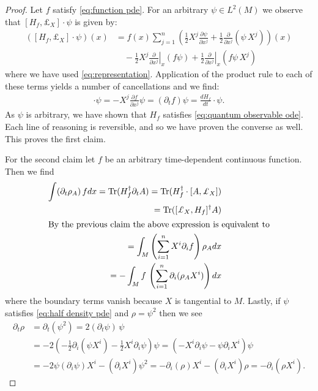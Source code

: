 \documentclass[final,leqno]{siamart}
\newcommand{\pder}[2]{\ensuremath{\frac{ \partial #1}{\partial #2}}}
\DeclareMathOperator{\Tr}{Tr}
\begin{document}
\begin{proof}
	Let $f$ satisfy \eqref{eq:function pde}.
	For an arbitrary $\psi \in L^{2}(M)$ we observe that $[ H_{f} , \pounds_{X}] \cdot \psi$ is given by:
	\begin{align*}
		\left( [ H_{f}, \pounds_{X} ] \cdot \psi \right)(x) &= f(x) \sum_{j=1}^{n} \left( \frac{1}{2} X^{j} \pder{\psi}{x^{j}} + \frac{1}{2} \pder{}{x^{j}} ( \psi \, X^{j} ) \right) (x) \\
			&\quad- \frac{1}{2} X^{j} \left. \pder{}{x^{j}} \right|_{x}( f \psi)  + \frac{1}{2} \left. \pder{}{x^{j}} \right|_{x}(f \psi \, X^{j} )
	\end{align*}
	where we have used \eqref{eq:representation}.  
	Application of the product rule to each of these terms yields a number of cancellations and we find:
	\begin{align*}
		[ H_{f} , \pounds_{X} ] \cdot \psi = - X^{j} \pder{f}{x^{j}} \psi = (\partial_{t} f )\psi = \frac{d H_{f} }{dt} \cdot \psi.
	\end{align*}
	As $\psi$ is arbitrary, we have shown that $H_{f}$ satisfies \eqref{eq:quantum observable ode}.
	Each line of reasoning is reversible, and so we have proven the converse as well.
	This proves the first claim.
	
	For the second claim let $f$ be an arbitrary time-dependent continuous function.
	Then we find
	\begin{align*}
		\int ( \partial_t \rho_A ) \, f dx = \Tr( H_f^\dagger \partial_t A ) = \Tr( H_f^\dagger \cdot [A , \pounds_X] ) \\
		= \Tr( [\pounds_X,H_f]^\dagger A) \\
		\intertext{By the previous claim the above expression is equivalent to}
		= \int_M \left( \sum_{i=1}^{n} X^i \partial_i f \right) \rho_A dx \\
		= - \int_M f \, \left(\sum_{i=1}^{n} \partial_i (\rho_A X^i ) \right) dx
	\end{align*}
	where the boundary terms vanish because $X$ is tangential to $M$.
%	
%	
	Lastly, if $\psi$ satisfies \eqref{eq:half density pde} and $\rho = \psi^{2}$ then we see
	\begin{align*}
		\partial_{t} \rho &= \partial_{t} ( \psi^{2}) = 2 (\partial_{t} \psi ) \, \psi \\
		&= - 2 \left( - \frac{1}{2} \partial_{i} (\psi X^{i}) - \frac{1}{2} X^{i} \partial_{i} \psi \right) \psi 
		= \left( - X^{i} \partial_{i} \psi - \psi \partial_{i} X^{i}  \right) \psi \\
		&= - 2 \psi (\partial_{i} \psi) X^{i} - (\partial_{i}X^{i}) \psi^{2}
		= - \partial_{i}(\rho) X^{i} - (\partial_{i}X^{i}) \rho = - \partial_{i} ( \rho X^{i}).
	\end{align*}
\end{proof}
\end{document}
